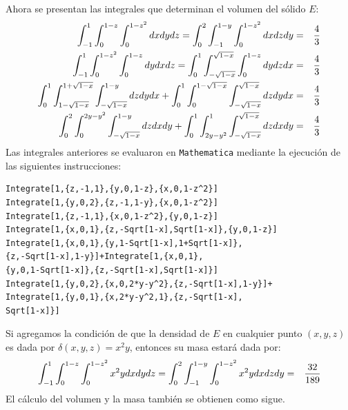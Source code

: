 Ahora se presentan las integrales que determinan el volumen del sólido $E$:
\begin{eqnarray*}
\displaystyle \int_{-1}^{1}\int_{0}^{1-z}\int_{0}^{1-z^2}dxdydz=\displaystyle\int_{0}^2\int_{-1}^{1-y}\int_{0}^{1-z^2}dxdzdy&=& \frac{4}{3}\\
\displaystyle \int_{-1}^{1}\int_{0}^{1-z^2}\int_{0}^{1-z}dydxdz=\displaystyle\int_{0}^{1}\int_{-\sqrt{1-x}}^{\sqrt{1-x}}\int_{0}^{1-z}dydzdx&=& \frac{4}{3}\\
\displaystyle \int_{0}^{1}\int_{1-\sqrt{1-x}}^{1+\sqrt{1-x}}\int_{-\sqrt{1-x}}^{1-y}dzdydx+\int_{0}^{1}\int_{0}^{1-\sqrt{1-x}}\int_{-\sqrt{1-x}}^{\sqrt{1-x}}dzdydx&=& \frac{4}{3}\\
\displaystyle \int_{0}^2\int_{0}^{2y-y^2}\int_{-\sqrt{1-x}}^{1-y}dzdxdy+\int_{0}^{1} \int_{2y-y^2}^{1}\int_{-\sqrt{1-x}}^{\sqrt{1-x}}dzdxdy&=& \frac{4}{3}
\end{eqnarray*}
Las integrales anteriores se evaluaron en \verb"Mathematica" mediante la ejecución de las siguientes instrucciones:

\begin{tcolorbox}[title=\bf Instrucción en \verb"Mathematica"]\begin{Verbatim}[formatcom=\letraverbatim]
Integrate[1,{z,-1,1},{y,0,1-z},{x,0,1-z^2}]
Integrate[1,{y,0,2},{z,-1,1-y},{x,0,1-z^2}]
Integrate[1,{z,-1,1},{x,0,1-z^2},{y,0,1-z}]
Integrate[1,{x,0,1},{z,-Sqrt[1-x],Sqrt[1-x]},{y,0,1-z}]
Integrate[1,{x,0,1},{y,1-Sqrt[1-x],1+Sqrt[1-x]},
{z,-Sqrt[1-x],1-y}]+Integrate[1,{x,0,1},
{y,0,1-Sqrt[1-x]},{z,-Sqrt[1-x],Sqrt[1-x]}]
Integrate[1,{y,0,2},{x,0,2*y-y^2},{z,-Sqrt[1-x],1-y}]+
Integrate[1,{y,0,1},{x,2*y-y^2,1},{z,-Sqrt[1-x],
Sqrt[1-x]}]
\end{Verbatim}
\end{tcolorbox}

Si agregamos la condición de que la densidad de $E$ en cualquier punto $(x,y,z)$ es
dada por $\delta(x,y,z)=x^2y$, entonces su masa estará dada por:
\begin{eqnarray*}
\displaystyle \int_{-1}^{1}\int_{0}^{1-z}\int_{0}^{1-z^2}x^2ydxdydz=\displaystyle\int_{0}^2\int_{-1}^{1-y}\int_{0}^{1-z^2}x^2ydxdzdy&=&\frac{32}{189}
\end{eqnarray*}
El cálculo del volumen y la masa también se obtienen como sigue.

